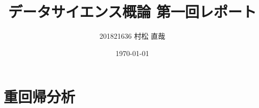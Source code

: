 \documentclass[uplatex]{jsarticle}
\begin{document}
\title{\huge データサイエンス概論 第一回レポート}
\author{201821636 村松 直哉}
\date{\today}
\maketitle

\section{重回帰分析}
\end{document}
